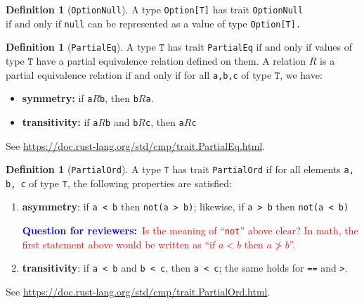 \documentclass[11pt,a4paper]{article}
\theoremstyle{definition}
\newtheorem{definition}[theorem]{Definition}
\newcommand{\inRust}[2]{See \url{#2}.}
\newcommand{\questionr}[1]{\textcolor{blue}{\textbf{Question for reviewers:}}\textcolor{red}{~#1}}
\newcommand{\T}{\texttt{T}}
\newcommand{\iffText}{\text{if and only if}}
\begin{document}
\begin{definition}[\texttt{OptionNull}]
A type \texttt{Option[T]} has trait \texttt{OptionNull} $\iffText$ \texttt{null} can be represented as a value of type \texttt{Option[T].}
\end{definition}


\begin{definition}[\texttt{PartialEq}]
    A type $\T$ has trait \texttt{PartialEq} $\iffText$ values of type $\T$ have a partial equivalence relation defined on them. A relation $R$ is a partial equivalence relation $\iffText$ for all \texttt{a,b,c} of type $\T$, we have:
    \begin{itemize}
        \item \textbf{symmetry:} if \texttt{a}$R$\texttt{b}, then \texttt{b}$R$\texttt{a}.
        \item \textbf{transitivity:} if \texttt{a}$R$\texttt{b} and \texttt{b}$R$\texttt{c}, then \texttt{a}$R$\texttt{c}
    \end{itemize}
    
    \inRust{Trait std::cmp::PartialEq}{https://doc.rust-lang.org/std/cmp/trait.PartialEq.html}
\end{definition}

\begin{definition}[\texttt{PartialOrd}]\label{def:partial}
A type \texttt{T} has trait \texttt{PartialOrd} if for all elements \texttt{a, b, c} of type \texttt{T}, the following properties are satisfied:

    \begin{enumerate}
        \item \textbf{asymmetry}: if \texttt{a < b} then \texttt{not(a > b)}; likewise, if \texttt{a > b} then \texttt{not(a < b)}
        
        \questionr{Is the meaning of ``\texttt{not}'' above clear? In math, the first statement above would be written as ``if $a < b$ then $a \ngtr b$''.}
        
        \item \textbf{transitivity}: if \texttt{a < b} and \texttt{b < c}, then \texttt{a < c}; the same holds for \texttt{==} and \texttt{>}.
    \end{enumerate}

\inRust{Trait std::cmp::PartialOrd}{https://doc.rust-lang.org/std/cmp/trait.PartialOrd.html}
\end{definition}
\end{document}
